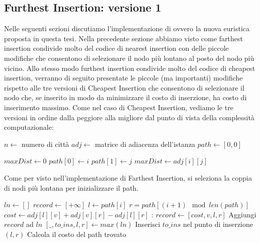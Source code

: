 \documentclass[a4paper,12pt]{report}
\begin{document}
\subsection{Furthest Insertion: versione 1}
Nelle seguenti sezioni discutiamo l'implementazione di  ovvero la nuova euristica proposta in questa tesi. Nella precedente sezione abbiamo visto come farthest insertion condivide molto del codice di nearest insertion con delle piccole modifiche che consentono di selezionare il nodo più lontano al posto del nodo più vicino. Allo stesso modo furthest insertion condivide molto del codice di cheapest insertion, verranno di seguito presentate le piccole (ma importanti) modifiche rispetto alle tre versioni di Cheapest Insertion che consentono di selezionare il nodo che, se inserito in modo da minimizzare il costo di inserzione, ha costo di inserimento massimo. Come nel caso di Cheapest Insertion, vediamo le tre versioni in ordine dalla peggiore alla migliore dal punto di vista della complessità computazionale:
\begin{tcolorbox}[colframe=black, colback=white, boxrule=0.5pt, title=Furthest Insertion Versione 1, coltitle=black, fonttitle=\bfseries, colbacktitle=white, breakable]
  \begin{algorithmic}[1]
    \State $n \gets$ numero di città
    \State $adj \gets$ matrice di adiacenza dell'istanza
    \State $path \gets [0, 0]$
    
    \State $maxDist \gets 0$
          \State $path[0] \gets i$
          \State $path[1] \gets j$
          \State $maxDist \gets adj[i][j]$
        \EndIf
      \EndFor
    \EndFor
  \end{algorithmic}
\end{tcolorbox}
Come per visto nell'implementazione di Farthest Insertion, si seleziona la coppia di nodi più lontana per inizializzare il path. 
\begin{tcolorbox}[colframe=black, colback=white, boxrule=0.5pt, title=Furthest Insertion Versione 1, coltitle=black, fonttitle=\bfseries, colbacktitle=white, breakable]
  \begin{algorithmic}[1]
      \State $ln \gets []$
        \State $record \gets [+\infty]$
          \State $l \gets path[i]$
          \State $r = path[(i + 1) \mod len(path)]$
          \State $cost \gets adj[l][v] + adj[v][r] - adj[l][r]$
          :
            \State $record \gets [cost, v, l, r]$
          \EndIf
          \EndFor
          \State Aggiungi $record$ ad $ln$
      \EndFor
      \State $[\_, to\_ins, l, r] \gets max(ln)$
      \State Inserisci $to\_ins$ nel punto di inserzione $(l, r)$
    \EndWhile               
    \State Calcola il costo del path trovato
  \end{algorithmic}
\end{tcolorbox}
\end{document}
